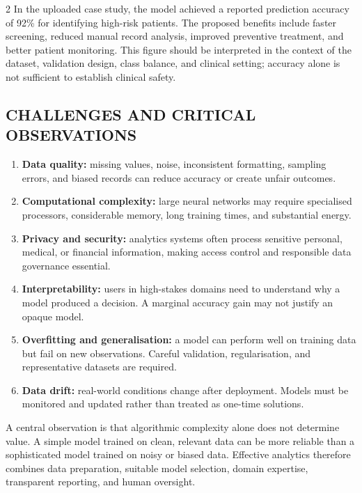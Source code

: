 \begin{multicols}{2}
  \noindent
  In the uploaded case study, the model achieved a reported prediction accuracy of 92\% for identifying high-risk patients. The proposed benefits include faster screening, reduced manual record analysis, improved preventive treatment, and better patient monitoring. This figure should be interpreted in the context of the dataset, validation design, class balance, and clinical setting; accuracy alone is not sufficient to establish clinical safety.

  \subsection*{\centering\uppercase{Challenges and Critical Observations}}

  \begin{enumerate}\justifying
    \item \textbf{Data quality:} missing values, noise, inconsistent formatting, sampling errors, and biased records can reduce accuracy or create unfair outcomes.
    \item \textbf{Computational complexity:} large neural networks may require specialised processors, considerable memory, long training times, and substantial energy.
    \item \textbf{Privacy and security:} analytics systems often process sensitive personal, medical, or financial information, making access control and responsible data governance essential.
    \item \textbf{Interpretability:} users in high-stakes domains need to understand why a model produced a decision. A marginal accuracy gain may not justify an opaque model.
    \item \textbf{Overfitting and generalisation:} a model can perform well on training data but fail on new observations. Careful validation, regularisation, and representative datasets are required.
    \item \textbf{Data drift:} real-world conditions change after deployment. Models must be monitored and updated rather than treated as one-time solutions.
  \end{enumerate}
  A central observation is that algorithmic complexity alone does not determine value. A simple model trained on clean, relevant data can be more reliable than a sophisticated model trained on noisy or biased data. Effective analytics therefore combines data preparation, suitable model selection, domain expertise, transparent reporting, and human oversight.


\end{multicols}

